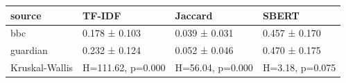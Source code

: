 \begin{tabular}{llll}
\toprule
source & TF-IDF & Jaccard & SBERT \\
\midrule
bbc & 0.178 ± 0.103 & 0.039 ± 0.031 & 0.457 ± 0.170 \\
guardian & 0.232 ± 0.124 & 0.052 ± 0.046 & 0.470 ± 0.175 \\
Kruskal-Wallis & H=111.62, p=0.000 & H=56.04, p=0.000 & H=3.18, p=0.075 \\
\bottomrule
\end{tabular}
